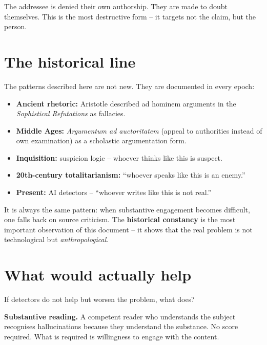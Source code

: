 The addressee is denied their own authorship. They are made to
doubt themselves. This is the most destructive form -- it targets
not the claim, but the person.

\section{The historical line}

The patterns described here are not new. They are documented in
every epoch:

\begin{itemize}[leftmargin=2em,itemsep=2pt,topsep=2pt]
  \item \textbf{Ancient rhetoric:} Aristotle described ad hominem
        arguments in the \emph{Sophistical Refutations} as
        fallacies.
  \item \textbf{Middle Ages:} \emph{Argumentum ad auctoritatem}
        (appeal to authorities instead of own examination) as a
        scholastic argumentation form.
  \item \textbf{Inquisition:} suspicion logic -- whoever thinks
        like this is suspect.
  \item \textbf{20th-century totalitarianism:} \enquote{whoever
        speaks like this is an enemy.}
  \item \textbf{Present:} AI detectors -- \enquote{whoever writes
        like this is not real.}
\end{itemize}

It is always the same pattern: when substantive engagement becomes
difficult, one falls back on source criticism. The \textbf{historical
constancy} is the most important observation of this document -- it
shows that the real problem is not technological but
\emph{anthropological}.

\section{What would actually help}

If detectors do not help but worsen the problem, what does?

\textbf{Substantive reading.} A competent reader who understands
the subject recognises hallucinations because they understand the
substance. No score required. What is required is willingness to
engage with the content.

